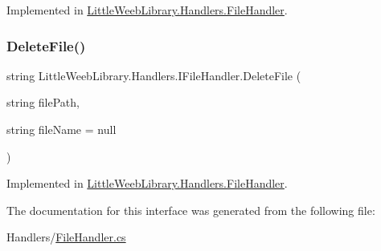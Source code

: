 Implemented in \mbox{\hyperlink{class_little_weeb_library_1_1_handlers_1_1_file_handler_a08cbef4974d973035a7ddeedb9f8ff4a}{Little\+Weeb\+Library.\+Handlers.\+File\+Handler}}.

\mbox{\label{interface_little_weeb_library_1_1_handlers_1_1_i_file_handler_aff6a35f857564900ae27586121a8bb41}} 
\subsubsection{\texorpdfstring{Delete\+File()}{DeleteFile()}}
{\footnotesize\ttfamily string Little\+Weeb\+Library.\+Handlers.\+I\+File\+Handler.\+Delete\+File (\begin{DoxyParamCaption}\item[{string}]{file\+Path,  }\item[{string}]{file\+Name = {\ttfamily null} }\end{DoxyParamCaption})}



Implemented in \mbox{\hyperlink{class_little_weeb_library_1_1_handlers_1_1_file_handler_ae1b342c4d821543a0a3400e4e0c95903}{Little\+Weeb\+Library.\+Handlers.\+File\+Handler}}.



The documentation for this interface was generated from the following file\+:\begin{DoxyCompactItemize}
\item 
Handlers/\mbox{\hyperlink{_file_handler_8cs}{File\+Handler.\+cs}}\end{DoxyCompactItemize}
